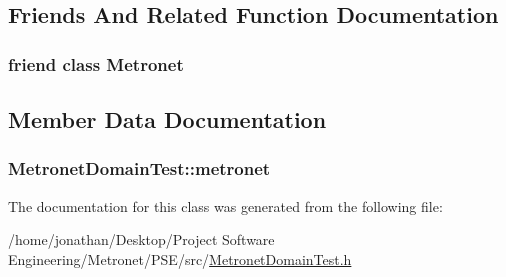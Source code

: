 \subsection{Friends And Related Function Documentation}
\subsubsection[{\texorpdfstring{Metronet}{Metronet}}]{\setlength{\rightskip}{0pt plus 5cm}friend class {\bf Metronet}\hspace{0.3cm}{\ttfamily [friend]}}\hypertarget{class_metronet_domain_test_a07c94fb69880743e62f64a941fc2d4ab}{}\label{class_metronet_domain_test_a07c94fb69880743e62f64a941fc2d4ab}


\subsection{Member Data Documentation}
\subsubsection[{\texorpdfstring{metronet}{metronet}}]{ Metronet\+Domain\+Test\+::metronet\hspace{0.3cm}{\ttfamily [protected]}}\hypertarget{class_metronet_domain_test_aa185f99af6607124a6fea8c4f63fddb7}{}\label{class_metronet_domain_test_aa185f99af6607124a6fea8c4f63fddb7}


The documentation for this class was generated from the following file\+:\begin{DoxyCompactItemize}
\item 
/home/jonathan/\+Desktop/\+Project Software Engineering/\+Metronet/\+P\+S\+E/src/\hyperlink{_metronet_domain_test_8h}{Metronet\+Domain\+Test.\+h}\end{DoxyCompactItemize}
